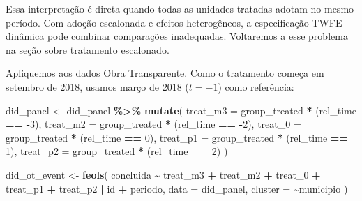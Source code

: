 \documentclass[
]{article}
\newenvironment{Shaded}{\begin{snugshade}}{\end{snugshade}}
\newcommand{\AttributeTok}[1]{\textcolor[rgb]{0.13,0.29,0.53}{#1}}
\newcommand{\DecValTok}[1]{\textcolor[rgb]{0.00,0.00,0.81}{#1}}
\newcommand{\FunctionTok}[1]{\textcolor[rgb]{0.13,0.29,0.53}{\textbf{#1}}}
\newcommand{\NormalTok}[1]{#1}
\newcommand{\OtherTok}[1]{\textcolor[rgb]{0.56,0.35,0.01}{#1}}
\newcommand{\SpecialCharTok}[1]{\textcolor[rgb]{0.81,0.36,0.00}{\textbf{#1}}}
\begin{document}
Essa interpretação é direta quando todas as unidades tratadas adotam no mesmo período. Com adoção escalonada e efeitos heterogêneos, a especificação TWFE dinâmica pode combinar comparações inadequadas. Voltaremos a esse problema na seção sobre tratamento escalonado.

Apliquemos aos dados Obra Transparente. Como o tratamento começa em setembro de 2018, usamos março de 2018 (\(t=-1\)) como referência:

\begin{Shaded}
\begin{Highlighting}[]
\NormalTok{did\_panel }\OtherTok{\textless{}{-}}\NormalTok{ did\_panel }\SpecialCharTok{\%\textgreater{}\%}
  \FunctionTok{mutate}\NormalTok{(}
    \AttributeTok{treat\_m3 =}\NormalTok{ group\_treated }\SpecialCharTok{*}\NormalTok{ (rel\_time }\SpecialCharTok{==} \SpecialCharTok{{-}}\DecValTok{3}\NormalTok{),}
    \AttributeTok{treat\_m2 =}\NormalTok{ group\_treated }\SpecialCharTok{*}\NormalTok{ (rel\_time }\SpecialCharTok{==} \SpecialCharTok{{-}}\DecValTok{2}\NormalTok{),}
    \AttributeTok{treat\_0  =}\NormalTok{ group\_treated }\SpecialCharTok{*}\NormalTok{ (rel\_time }\SpecialCharTok{==} \DecValTok{0}\NormalTok{),}
    \AttributeTok{treat\_p1 =}\NormalTok{ group\_treated }\SpecialCharTok{*}\NormalTok{ (rel\_time }\SpecialCharTok{==} \DecValTok{1}\NormalTok{),}
    \AttributeTok{treat\_p2 =}\NormalTok{ group\_treated }\SpecialCharTok{*}\NormalTok{ (rel\_time }\SpecialCharTok{==} \DecValTok{2}\NormalTok{)}
\NormalTok{  )}

\NormalTok{did\_ot\_event }\OtherTok{\textless{}{-}} \FunctionTok{feols}\NormalTok{(}
\NormalTok{  concluida }\SpecialCharTok{\textasciitilde{}}\NormalTok{ treat\_m3 }\SpecialCharTok{+}\NormalTok{ treat\_m2 }\SpecialCharTok{+}\NormalTok{ treat\_0 }\SpecialCharTok{+}\NormalTok{ treat\_p1 }\SpecialCharTok{+}\NormalTok{ treat\_p2 }\SpecialCharTok{|}\NormalTok{ id }\SpecialCharTok{+}\NormalTok{ periodo,}
  \AttributeTok{data =}\NormalTok{ did\_panel,}
  \AttributeTok{cluster =} \SpecialCharTok{\textasciitilde{}}\NormalTok{municipio}
\NormalTok{)}


\end{Highlighting}
\end{Shaded}
\end{document}
